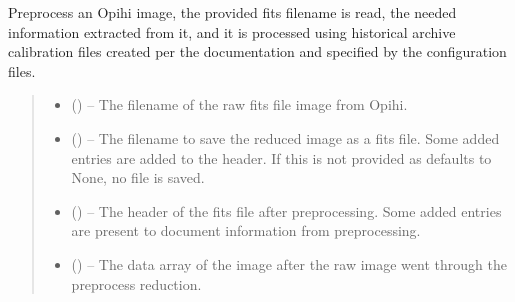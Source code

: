 \documentclass[letterpaper,11pt,english]{sphinxmanual}
\begin{document}
\begin{savenotes}
\begin{fulllineitems}
\begin{savenotes}\begin{fulllineitems}
\label{\detokenize{code/opihiexarata.opihi.preprocess:opihiexarata.opihi.preprocess.OpihiPreprocessSolution.preprocess_fits_file}}
\pysigstartsignatures
{}
\pysigstopsignatures
\sphinxAtStartPar
Preprocess an Opihi image, the provided fits filename is read, the
needed information extracted from it, and it is processed using
historical archive calibration files created per the documentation and
specified by the configuration files.
\begin{quote}\begin{description}
\begin{itemize}
\item {} 
\sphinxAtStartPar
{} () – The filename of the raw fits file image from Opihi.

\item {} 
\sphinxAtStartPar
{} (\sphinxstyleliteralemphasis{\sphinxupquote{, }}) – The filename to save the reduced image as a fits file. Some added
entries are added to the header. If this is not provided as
defaults to None, no file is saved.

\end{itemize}

\sphinxAtStartPar
\begin{itemize}
\item {} 
\sphinxAtStartPar
{} () – The header of the fits file after preprocessing. Some added
entries are present to document information from preprocessing.

\item {} 
\sphinxAtStartPar
{} () – The data array of the image after the raw image went through the
preprocess reduction.

\end{itemize}


\end{description}\end{quote}

\end{fulllineitems}\end{savenotes}


\end{fulllineitems}\end{savenotes}
\end{document}
